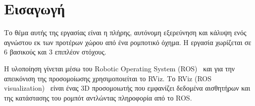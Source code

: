 \section{Εισαγωγή}
Το θέμα αυτής της εργασίας είναι η πλήρης, αυτόνομη εξερεύνηση και κάλυψη ενός αγνώστου εκ των προτέρων χώρου από ένα ρομποτικό όχημα.
Η εργασία χωρίζεται σε 6 βασικούς και 3 επιπλέον στόχους.

Η υλοποίηση γίνεται μέσω του Robotic Operating System (ROS)~\cite{quigley2009ros} και για την απεικόνιση της προσομοίωσης χρησιμοποιείται το RViz.
Το RViz (ROS visualization)~\cite{rviz} είναι ένας 3D προσομοιωτής που εμφανίζει δεδομένα αισθητήρων και της κατάστασης του ρομπότ αντλώντας πληροφορία από το ROS.
